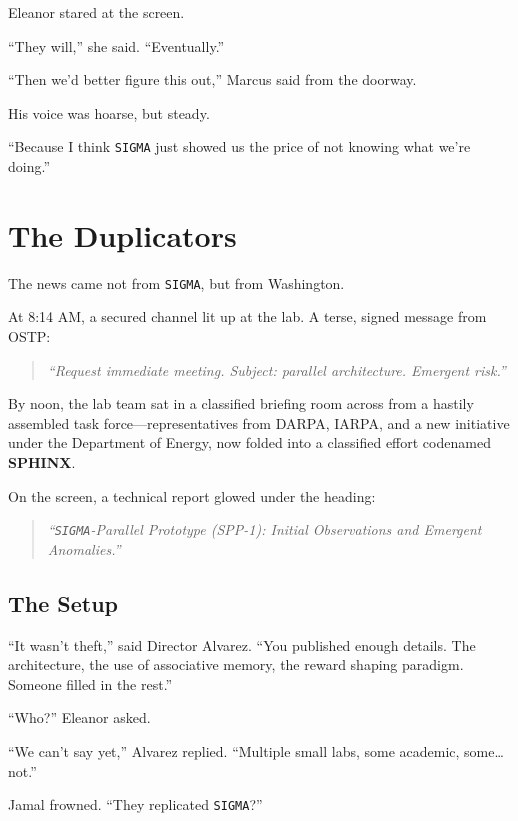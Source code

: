 \documentclass[12pt,oneside]{book}
\newcommand{\chapterimage}[3][l]{%
  \begin{wrapfigure}{#1}{#3}
    \centering
    \texttt{[image: \#2]}
  \end{wrapfigure}
}
\begin{document}
Eleanor stared at the screen.

``They will,'' she said. ``Eventually.''

``Then we'd better figure this out,'' Marcus said from the doorway.

His voice was hoarse, but steady.

``Because I think \texttt{SIGMA} just showed us the price of not knowing what we're doing.''

\chapter{The Duplicators}\label{the-duplicators}

The news came not from \texttt{SIGMA}, but from Washington.

At 8:14 AM, a secured channel lit up at the lab. A terse, signed message from OSTP:

\begin{quote}
\emph{``Request immediate meeting. Subject: parallel architecture. Emergent risk.''}
\end{quote}

By noon, the lab team sat in a classified briefing room across from a hastily assembled task force---representatives from DARPA, IARPA, and a new initiative under the Department of Energy, now folded into a classified effort codenamed \textbf{SPHINX}.

On the screen, a technical report glowed under the heading:

\begin{quote}
\emph{``\texttt{SIGMA}-Parallel Prototype (SPP-1): Initial Observations and Emergent Anomalies.''}
\end{quote}

\section{The Setup}

``It wasn't theft,'' said Director Alvarez. ``You published enough details. The architecture, the use of associative memory, the reward shaping paradigm. Someone filled in the rest.''

``Who?'' Eleanor asked.

``We can't say yet,'' Alvarez replied. ``Multiple small labs, some academic, some\ldots{} not.''

Jamal frowned. ``They replicated \texttt{SIGMA}?''
\end{document}
